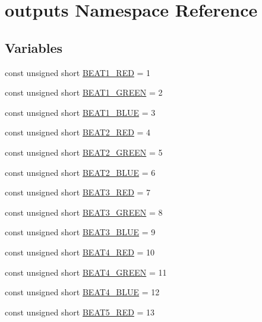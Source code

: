 \hypertarget{namespaceoutputs}{}\section{outputs Namespace Reference}
\label{namespaceoutputs}
\subsection*{Variables}
\begin{DoxyCompactItemize}
\item 
const unsigned short \hyperlink{namespaceoutputs_ae1c055268c6bbfadcc272bc6028b1a59}{B\+E\+A\+T1\+\_\+\+R\+ED} = 1
\item 
const unsigned short \hyperlink{namespaceoutputs_ad934b2db0cff1421ca84b300dc257508}{B\+E\+A\+T1\+\_\+\+G\+R\+E\+EN} = 2
\item 
const unsigned short \hyperlink{namespaceoutputs_a7c39d2e5116c2502c2b90bf1e8be5520}{B\+E\+A\+T1\+\_\+\+B\+L\+UE} = 3
\item 
const unsigned short \hyperlink{namespaceoutputs_a7b5646e7b81bc49443f10f2b852384bb}{B\+E\+A\+T2\+\_\+\+R\+ED} = 4
\item 
const unsigned short \hyperlink{namespaceoutputs_ad2dc5e7bf8fd1c9ffa64cf8efdb0035a}{B\+E\+A\+T2\+\_\+\+G\+R\+E\+EN} = 5
\item 
const unsigned short \hyperlink{namespaceoutputs_ac6bffee9716f79b218c8fb366351032e}{B\+E\+A\+T2\+\_\+\+B\+L\+UE} = 6
\item 
const unsigned short \hyperlink{namespaceoutputs_a0c48c063f394a0735f24036e932bff2b}{B\+E\+A\+T3\+\_\+\+R\+ED} = 7
\item 
const unsigned short \hyperlink{namespaceoutputs_a95e392d21973d605abcc9efc19dce314}{B\+E\+A\+T3\+\_\+\+G\+R\+E\+EN} = 8
\item 
const unsigned short \hyperlink{namespaceoutputs_ae87166c20e497c5b092a92bc98da94c2}{B\+E\+A\+T3\+\_\+\+B\+L\+UE} = 9
\item 
const unsigned short \hyperlink{namespaceoutputs_a73a38f1135a723ebb294500daa641aec}{B\+E\+A\+T4\+\_\+\+R\+ED} = 10
\item 
const unsigned short \hyperlink{namespaceoutputs_afd9270436632213bade739dbc4f6c8f6}{B\+E\+A\+T4\+\_\+\+G\+R\+E\+EN} = 11
\item 
const unsigned short \hyperlink{namespaceoutputs_aa66f074e1960dc7dbf507acdf6cc5ae3}{B\+E\+A\+T4\+\_\+\+B\+L\+UE} = 12
\item 
const unsigned short \hyperlink{namespaceoutputs_a992a202d7fce79a524fe71498efb3709}{B\+E\+A\+T5\+\_\+\+R\+ED} = 13

\end{DoxyCompactItemize}
